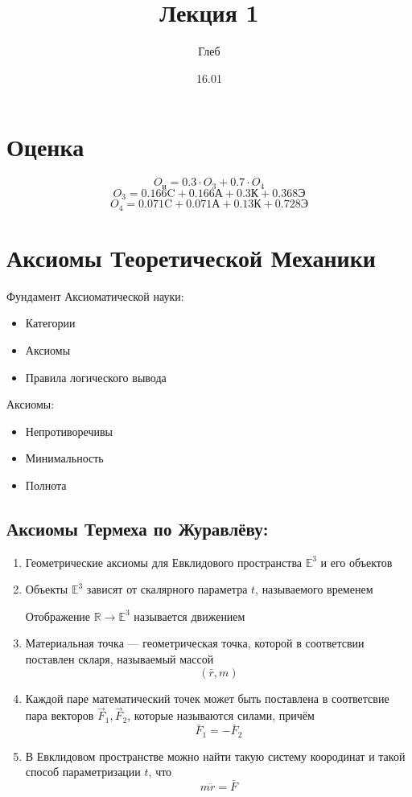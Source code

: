 \documentclass[12pt, a4paper]{article}
\title{\textbf{Лекция 1}}
\author{Глеб}
\date{16.01}
\begin{document}
\maketitle
\pagestyle{plain} %
\section*{Оценка}
\[
O_{\text{и}} = 0.3 \cdot O_3 + 0.7 \cdot O_4
\]
\[
O_3 = 0.166 \text{C} + 0.166 \text{А} +  0.3 \text{К} + 0.368 \text{Э}
\]
\[
O_4 = 0.071 \text{C} + 0.071 \text{А} +  0.13 \text{К} + 0.728 \text{Э}
\]
\section{Аксиомы Теоретической Механики}
\begin{minipage}[t]{0.48\textwidth}
Фундамент Аксиоматической науки:
\begin{itemize}
    \item Категории
    \item Аксиомы %
    \item Правила логического вывода
\end{itemize}
\end{minipage}
\hfill
\begin{minipage}[t]{0.48\textwidth}
Аксиомы: %
\begin{itemize}
    \item Непротиворечивы
    \item Минимальность
    \item Полнота
\end{itemize}
\end{minipage}
\subsection{Аксиомы Термеха по Журавлёву:}
\begin{enumerate}
    \item Геометрические аксиомы для Евклидового пространства $\mathbb E^3$ и его объектов
    \item Объекты $\mathbb E^3$ зависят от скалярного параметра $t$, называемого временем
    
    Отображение $\mathbb R \rightarrow \mathbb E^3$ называется движением
    \item Материальная точка — геометрическая точка, которой в соответсвии поставлен скларя, называемый массой
    $$(\bar r, m)$$
    \item Каждой паре математический точек может быть поставлена в соответсвие пара векторов $\vec F_1, \vec F_2$, которые называются силами, причём
$$\bar F_1 = - \bar F_2$$
    \item В Евклидовом пространстве можно найти такую систему коородинат и такой способ параметризации $t$, что 
\[m \ddot r = \bar F\]
\end{enumerate}
\end{document}
